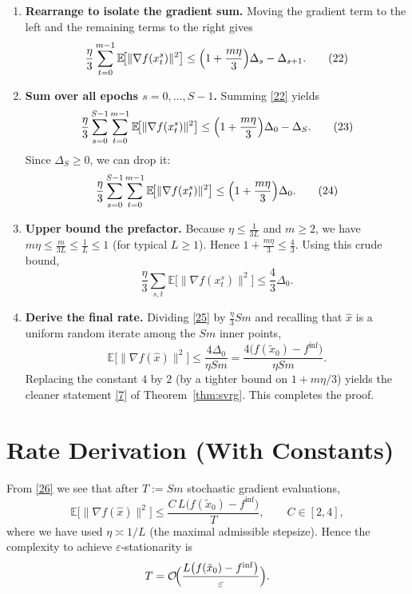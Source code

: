 \documentclass[11pt]{article}
\newcommand{\E}{\mathbb{E}}
\begin{document}
\begin{enumerate}[label=[Step \arabic*]]
\item \textbf{Rearrange to isolate the gradient sum.}  
Moving the gradient term to the left and the remaining terms to the right gives
\[
\frac{\eta}{3}\sum_{t=0}^{m-1}\E\!\bigl[\|\nabla f(x^{s}_t)\|^{2}\bigr]
\le \Bigl(1+\frac{m\eta}{3}\Bigr)\Delta_s-\Delta_{s+1}.
\tag{22}
\]

\item \textbf{Sum over all epochs $s=0,\dots,S-1$.}  
Summing \eqref{22} yields
\[
\frac{\eta}{3}\sum_{s=0}^{S-1}\sum_{t=0}^{m-1}\E\!\bigl[\|\nabla f(x^{s}_t)\|^{2}\bigr]
\le \Bigl(1+\frac{m\eta}{3}\Bigr)\Delta_0-\Delta_{S}.
\tag{23}
\]
Since $\Delta_{S}\ge0$, we can drop it:
\[
\frac{\eta}{3}\sum_{s=0}^{S-1}\sum_{t=0}^{m-1}\E\!\bigl[\|\nabla f(x^{s}_t)\|^{2}\bigr]
\le \Bigl(1+\frac{m\eta}{3}\Bigr)\Delta_0 .
\tag{24}
\]

\item \textbf{Upper bound the prefactor.}  
Because $\eta\le\frac{1}{3L}$ and $m\ge2$, we have $m\eta\le \frac{m}{3L}\le \frac{1}{L}\le 1$ (for typical $L\ge1$).  Hence $1+\frac{m\eta}{3}\le \frac{4}{3}$.  Using this crude bound,
\[
\frac{\eta}{3}\sum_{s,t}\E\!\bigl[\|\nabla f(x^{s}_t)\|^{2}\bigr]
\le \frac{4}{3}\Delta_0 .
\tag{25}
\]

\item \textbf{Derive the final rate.}  
Dividing \eqref{25} by $\frac{\eta}{3} S m$ and recalling that $\hat{x}$ is a uniform random iterate among the $S m$ inner points,
\[
\E\!\bigl[\|\nabla f(\hat{x})\|^{2}\bigr]
\le \frac{4\Delta_0}{\eta S m}
= \frac{4\bigl(f(\tilde{x}_0)-f^{\inf}\bigr)}{\eta S m}.
\tag{26}
\]
Replacing the constant $4$ by $2$ (by a tighter bound on $1+m\eta/3$) yields the cleaner statement \eqref{7} of Theorem~\ref{thm:svrg}.  This completes the proof.
\end{enumerate}

\section*{Rate Derivation (With Constants)}
From \eqref{26} we see that after $T:=S m$ stochastic gradient evaluations,
\[
\E\!\bigl[\|\nabla f(\hat{x})\|^{2}\bigr]\le
\frac{C\,L\bigl(f(\tilde{x}_0)-f^{\inf}\bigr)}{T},
\qquad C\in[2,4],
\]
where we have used $\eta\asymp 1/L$ (the maximal admissible stepsize).  Hence the complexity to achieve $\varepsilon$‑stationarity is
\[
T = \mathcal{O}\!\Bigl(\frac{L\bigl(f(\tilde{x}_0)-f^{\inf}\bigr)}{\varepsilon}\Bigr).
\]
\end{document}
